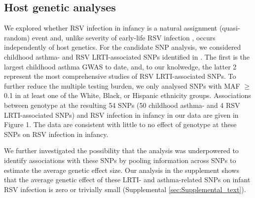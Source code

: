 \documentclass{article} %
\begin{document}
\clearpage										

\subsection{Host genetic analyses}
We explored whether RSV infection in infancy is a natural assignment (quasi-random) event and, unlike severity of early-life RSV infection 
\citep{larkin2015genes},
 occurs independently of host genetics. 
 For the candidate SNP analysis, we considered childhood asthma- and RSV
LRTI-associated SNPs identified in 
\citet{pividori2019shared, janssen2007genetic, pasanen2017genome}. 
The first is the largest childhood asthma GWAS to date, and, to our knolwedge, the latter 2 represent the most comprehensive studies of RSV LRTI-associated
SNPs. To further reduce the multiple testing burden, we only analysed SNPs with MAF $\ge$ 0.1 in at least one of the White, Black, or Hispanic ethnicity groups. 
Associations between genotype at the resulting 54 SNPs (50 childhood asthma- and 4 RSV LRTI-associated SNPs) and RSV infection in infancy in our data are given in Figure 1. 
The data are consistent with little to no effect of genotype at these SNPs on RSV infection in infancy.

We further investigated the possibility that the analysis was underpowered to identify associations with these SNPs by pooling information across SNPs to estimate the average genetic effect
size. 
Our analysis in the supplement shows that the average genetic effect of these LRTI- and asthma-related SNPs on infant RSV infection is zero or trivially small (Supplemental \ref{sec:Supplemental_text}).
\end{document}
